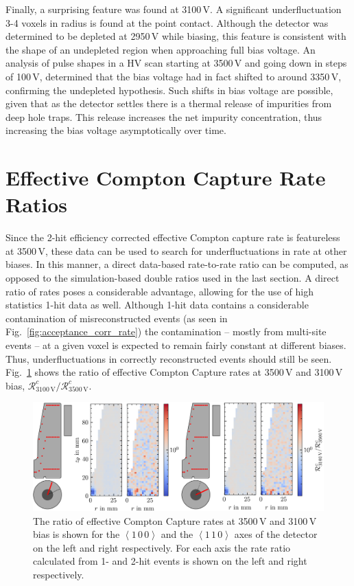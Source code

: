 Finally, a surprising feature was found at 3100\,V. A significant underfluctuation 3-4 voxels in radius is found at the point contact. Although the detector was determined to be depleted at 2950\,V while biasing, this feature is consistent with the shape of an undepleted region when approaching full bias voltage. An analysis of pulse shapes in a HV scan starting at 3500\,V and going down in steps of 100\,V, determined that the bias voltage had in fact shifted to around 3350\,V, confirming the undepleted hypothesis. Such shifts in bias voltage are possible, given that as the detector settles there is a thermal release of impurities from deep hole traps. This release increases the net impurity concentration, thus increasing the bias voltage asymptotically over time.


\section{Effective Compton Capture Rate Ratios}

Since the 2-hit efficiency corrected effective Compton capture rate is featureless at 3500\,V, these data can be used to search for underfluctuations in rate at other biases. In this manner, a direct data-based rate-to-rate ratio can be computed, as opposed to the simulation-based double ratios used in the last section. A direct ratio of rates poses a considerable advantage, allowing for the use of high statistics 1-hit data as well. Although 1-hit data contains a considerable contamination of misreconstructed events (as seen in Fig.~\ref{fig:acceptance_corr_rate}) the contamination -- mostly from multi-site events -- at a given voxel is expected to remain fairly constant at different biases. Thus, underfluctuations in correctly reconstructed events should still be seen. Fig.~\ref{fig:biascomp_axis_ratios} shows the ratio of effective Compton Capture rates at 3500\,V and 3100\,V bias, $\mathcal{R}^c_{3100\,\text{V}}/\mathcal{R}^c_{3500\,\text{V}}$.
\begin{figure}[htb]
    \centering
    \includegraphics[width=6in]{figs/trapping/biascomp_axis_ratios.png}
    \caption{The ratio of effective Compton Capture rates at 3500\,V and 3100\,V bias is shown for the $\left<1\,0\,0\right>$ and the $\left<1\,1\,0\right>$ axes of the detector on the left and right respectively. For each axis the rate ratio calculated from 1- and 2-hit events is shown on the left and right respectively.}
	\label{fig:biascomp_axis_ratios}
\end{figure}

